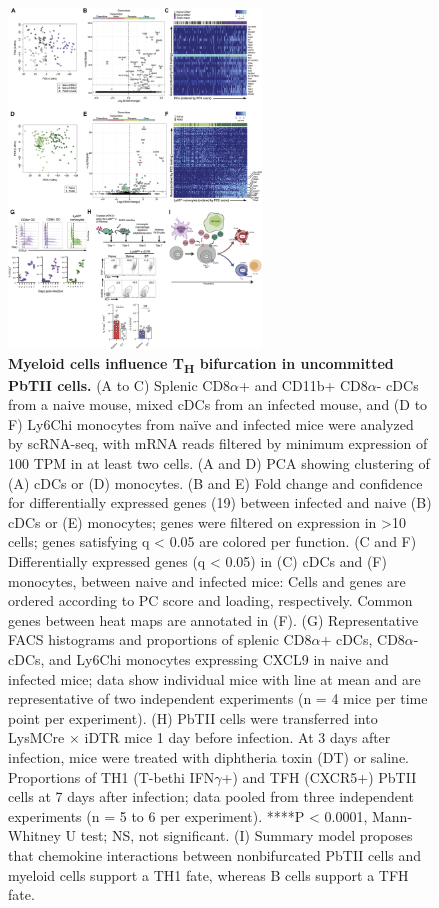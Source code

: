 \begin{figure}
    \centering
    \includegraphics[width=0.6\textwidth]{"Fig6"}
    \caption[Myeloid cells influence T\textsubscript{H} bifurcation in uncommitted PbTII cells]{\textbf{Myeloid cells influence T\textsubscript{H} bifurcation in uncommitted PbTII cells.} (A to C) Splenic CD8\( \alpha \)+ and CD11b+ CD8\( \alpha \)- cDCs from a naive mouse, mixed cDCs from an infected mouse, and (D to F) Ly6Chi monocytes from naïve and infected mice were analyzed by scRNA-seq, with mRNA reads filtered by minimum expression of 100 TPM in at least two cells. (A and D) PCA showing clustering of (A) cDCs or (D) monocytes. (B and E) Fold change and confidence for differentially expressed genes (19) between infected and naive (B) cDCs or (E) monocytes; genes were filtered on expression in >10 cells; genes satisfying q < 0.05 are colored per function. (C and F) Differentially expressed genes (q < 0.05) in (C) cDCs and (F) monocytes, between naive and infected mice: Cells and genes are ordered according to PC score and loading, respectively. Common genes between heat maps are annotated in (F). (G) Representative FACS histograms and proportions of splenic CD8\( \alpha \)+ cDCs, CD8\( \alpha \)- cDCs, and Ly6Chi monocytes expressing CXCL9 in naive and infected mice; data show individual mice with line at mean and are representative of two independent experiments (n = 4 mice per time point per experiment). (H) PbTII cells were transferred into LysMCre × iDTR mice 1 day before infection. At 3 days after infection, mice were treated with diphtheria toxin (DT) or saline. Proportions of TH1 (T-bethi IFN\( \gamma \)+) and TFH (CXCR5+) PbTII cells at 7 days after infection; data pooled from three independent experiments (n = 5 to 6 per experiment). ****P < 0.0001, Mann-Whitney U test; NS, not significant. (I) Summary model proposes that chemokine interactions between nonbifurcated PbTII cells and myeloid cells support a TH1 fate, whereas B cells support a TFH fate.}
    \label{fig:monocytes}
\end{figure}


